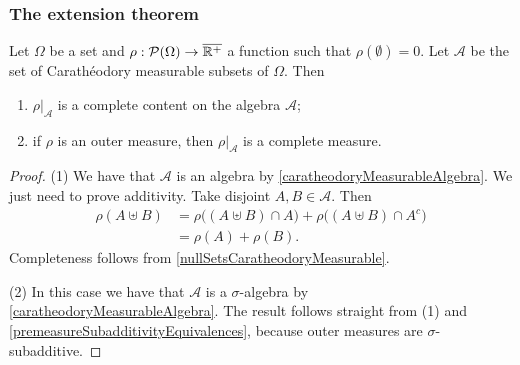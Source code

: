 \subsubsection{The extension theorem}
\begin{proposition} \label{caratheodoryLemma}
Let $\Omega$ be a set and $\rho: \operatorname{\mathcal{P}}(\Omega) \to \overline{\mathbb{R}^+}$ a function such that $\rho(\emptyset) = 0$. Let $\mathcal{A}$ be the set of Carathéodory measurable subsets of $\Omega$. Then
\begin{enumerate}
\item $\rho|_{\mathcal{A}}$ is a complete content on the algebra $\mathcal{A}$;
\item if $\rho$ is an outer measure, then $\rho|_{\mathcal{A}}$ is a complete measure.
\end{enumerate}
\end{proposition}
\begin{proof}
(1) We have that $\mathcal{A}$ is an algebra by \ref{caratheodoryMeasurableAlgebra}. We just need to prove additivity. Take disjoint $A,B\in\mathcal{A}$. Then
\begin{align*}
\rho(A\uplus B) &= \rho\big((A\uplus B)\cap A\big) + \rho\big((A\uplus B)\cap A^c\big) \\
&= \rho(A) + \rho(B).
\end{align*}
Completeness follows from \ref{nullSetsCaratheodoryMeasurable}.

(2) In this case we have that $\mathcal{A}$ is a $\sigma$-algebra by \ref{caratheodoryMeasurableAlgebra}. The result follows straight from (1) and \ref{premeasureSubadditivityEquivalences}, because outer measures are $\sigma$-subadditive. 
\end{proof}

